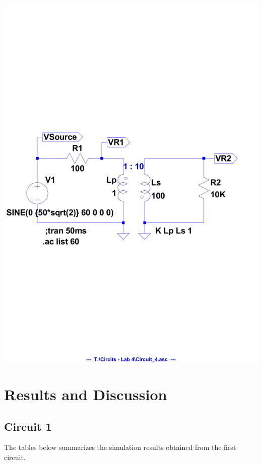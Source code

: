 \documentclass[journal]{IEEEtran}
\begin{document}
\begingroup
    \centering
    \medskip
    \includegraphics[clip, trim=0.0cm 9cm 0.0cm 9cm, width=\columnwidth]{images/labx_7.pdf}
    \label{fig:circuit4}
    \medskip
\endgroup

\section{Results and Discussion}

\subsection{Circuit 1}

\noindent The tables below summarizes the simulation results obtained from the first circuit. \\
\end{document}
